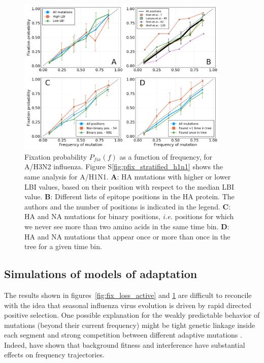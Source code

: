 \documentclass[reprint,amsmath,amssymb,superscriptaddress,showpacs,rmp]{revtex4-1}
\newcommand{\sref}[1]{S\ref{#1}}
\begin{document}
\begin{figure}
	\centering
	\includegraphics[width=0.9\textwidth]{./Figures/Panel3.png}
	\caption{Fixation probability $P_{fix}(f)$ as a function of frequency, for A/H3N2 influenza. Figure \sref{fig:pfix_stratified_h1n1} shows the same analysis for A/H1N1. \textbf{A}: HA mutations with higher or lower LBI values, based on their position with respect to the median LBI value. \textbf{B}: Different lists of epitope positions in the HA protein. The authors and the number of positions is indicated in the legend. \textbf{C}: HA and NA mutations for binary positions, \emph{i.e.} positions for which we never see more than two amino acids in the same time bin. \textbf{D}: HA and NA mutations that appear once or more than once in the tree for a given time bin.}
	\label{fig:pfix_stratified}
\end{figure}

\subsection*{Simulations of models of adaptation}
\label{sub:a_simple_model}

The results shown in figures~\ref{fig:fix_loss_active} and \ref{fig:pfix_stratified} are difficult to reconcile with the idea that seasonal influenza virus evolution is driven by rapid directed positive selection.
One possible explanation for the weakly predictable behavior of mutations (beyond their current frequency) might be tight genetic linkage inside each segment and strong competition between different adaptive mutations \citep{neher_genetic_2011,strelkowa_clonal_2012}.
Indeed, \citet{illingworth_components_2012} have shown that background fitness and interference have substantial effects on frequency trajectories.
\end{document}
